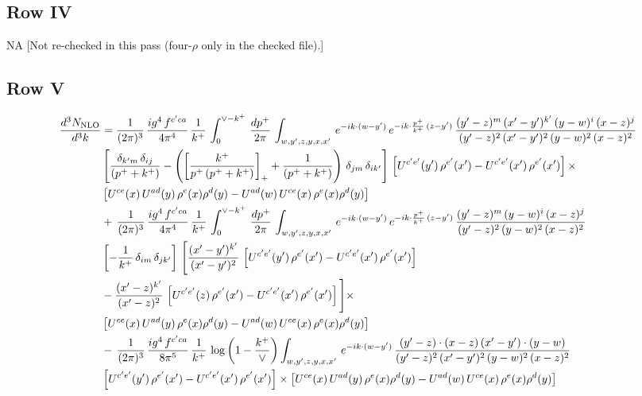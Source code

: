 \documentclass[9pt]{article}
\numberwithin{equation}{section}
\begin{document}
\subsection{Row IV}
\textsc{NA} {\color{red}[Not re-checked in this pass (four-$\rho$ only in the checked file).]}
\subsection{Row V}
\begin{align}
    \frac{d^{3}N_{\rm NLO}}{d^{3}k} & =  \frac{1}{(2\pi)^{3}}\, \frac{ig^{4}\,f^{c'ca}}{4\pi^{4}}\, \frac{1}{k^{+}}\,\int_{0}^{\vee-k^{+}}\, \frac{dp^{+}}{2\pi}\, \int_{w,y',z,y,x,x'}\, e^{-ik\cdot (w-y')}\, e^{-ik\cdot \frac{p^{+}}{k^{+}}\,(z-y')}\,\frac{(y'-z)^{m}\,(x'-y')^{k'}\,(y-w)^{i}\,(x-z)^{j}}{(y'-z)^{2}\,(x'-y')^{2}\,(y-w)^{2}\,(x-z)^{2}}\notag \\ & \left[\frac{\delta_{k'm}\,\delta_{ij}}{(p^{+}+k^{+})}-\left(\left[\frac{k^{+}}{p^{+}\,(p^{+}+k^{+})}\right]_{+}+\frac{1}{(p^{+}+k^{+})}\right)\,\delta_{jm}\,\delta_{ik'}\right]\, \left[U^{c'e'}(y')\,\rho^{e'}(x')-U^{c'e'}(x')\,\rho^{e'}(x')\right]\times \notag \\ &  \left[U^{ce}(x)\,U^{ad}(y)\,\rho^{e}(x)\rho^{d}(y)-U^{ad}(w)\,U^{ce}(x)\,\rho^{e}(x)\rho^{d}(y)\right] \notag \\
&   +\,\frac{1}{(2\pi)^{3}}\, \frac{ig^{4}\,f^{c'ca}}{4\pi^{4}}\, \frac{1}{k^{+}}\,\int_{0}^{\vee-k^{+}}\, \frac{dp^{+}}{2\pi}\, \int_{w,y',z,y,x,x'}\, e^{-ik\cdot (w-y')}\, e^{-ik\cdot \frac{p^{+}}{k^{+}}\,(z-y')}\,\frac{(y'-z)^{m}\,(y-w)^{i}\,(x-z)^{j}}{(y'-z)^{2}\,(y-w)^{2}\,(x-z)^{2}}\notag \\ &   \left[-\frac{1}{k^{+}}\, \delta_{im}\, \delta_{jk'}\right]\, \Bigg[\frac{(x'-y')^{k'}}{(x'-y')^{2}}\,\left[U^{c'e'}(y')\,\rho^{e'}(x')-U^{c'e'}(x')\,\rho^{e'}(x')\right]\notag \\ & -\frac{(x'-z)^{k'}}{(x'-z)^{2}}\,\left[U^{c'e'}(z)\,\rho^{e'}(x')-U^{c'e'}(x')\,\rho^{e'}(x')\right]\Bigg]\times \notag \\ &    \left[U^{ce}(x)\,U^{ad}(y)\,\rho^{e}(x)\rho^{d}(y)-U^{ad}(w)\,U^{ce}(x)\,\rho^{e}(x)\rho^{d}(y)\right] \notag \\
& -\,\frac{1}{(2\pi)^{3}}\, \frac{ig^{4}\,f^{c'ca}}{8\pi^{5}}\, \frac{1}{k^{+}}\,\log{\left(1-\frac{k^{+}}{\vee}\right)} \int_{w,y',z,y,x,x'}\, e^{-ik\cdot (w-y')}\,\frac{(y'-z)\cdot (x-z)\,(x'-y')\cdot (y-w)}{(y'-z)^{2}\,(x'-y')^{2}\,(y-w)^{2}\,(x-z)^{2}}\notag \\ & \left[U^{c'e'}(y')\,\rho^{e'}(x')-U^{c'e'}(x')\,\rho^{e'}(x')\right]\times  \left[U^{ce}(x)\,U^{ad}(y)\,\rho^{e}(x)\rho^{d}(y)-U^{ad}(w)\,U^{ce}(x)\,\rho^{e}(x)\rho^{d}(y)\right]

\end{align}
\end{document}

